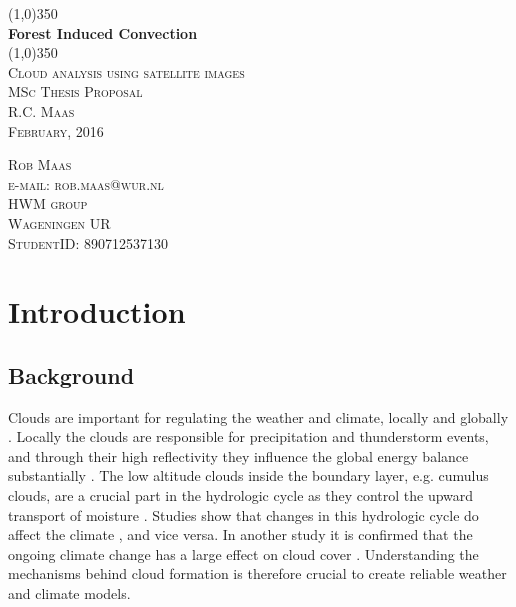 \documentclass{article}
\begin{document}

\thispagestyle{empty}
\begin{titlepage}   %
	\begin{center}      %
		\line(1,0){350}\\
		\huge{\bfseries Forest Induced Convection}\\
		[-4mm]
		\line(1,0){350}	\\
		[0.75cm]
		\textsc{\Large Cloud analysis using satellite images}\\
		[1.5cm]
		\textsc{\LARGE MSc Thesis Proposal}\\
		[1cm]
		\textsc{\large R.C. Maas\\
		February, 2016 \\
		[10cm]}
	\end{center}
	\begin{flushleft}   %
		\textsc{\large Rob Maas\\
			e-mail: rob.maas@wur.nl \\
			HWM group \\
			Wageningen UR\\
			StudentID: 890712537130 \\}
	\end{flushleft}
\end{titlepage}


\tableofcontents
\thispagestyle{empty}
\cleardoublepage

\setcounter{page}{1}

\section{Introduction}\label{sec:intro}   %
\subsection{Background}
Clouds are important for regulating the weather and climate, locally and globally \parencite{tiedtke93}. Locally the clouds are responsible for precipitation and thunderstorm events, and through their high reflectivity they influence the global energy balance substantially  \parencite{hartmann92}. The low altitude clouds inside the boundary layer, e.g. cumulus clouds, are a crucial part in the hydrologic cycle as they control the upward transport of moisture \parencite{arellano12}. Studies show that changes in this hydrologic cycle do affect the climate \parencite{pielke98}, and vice versa. In another study it is confirmed that the ongoing climate change has a large effect on cloud cover \parencite{arellano12}. Understanding the mechanisms behind cloud formation is therefore crucial to create reliable weather and climate models.\\
\end{document}
